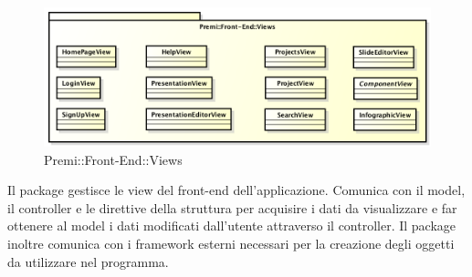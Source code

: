 \begin{figure}[h]
	\centering
	\includegraphics[width=0.7\linewidth]{img/premi_front_end_views}
	\caption[Premi::Front-End::Views]{Premi::Front-End::Views}
\end{figure}
Il package gestisce le view del front-end dell'applicazione. Comunica con il model, il controller e le direttive della struttura per acquisire i dati da visualizzare e far ottenere al model i dati modificati dall'utente attraverso il controller. Il package inoltre comunica con i framework esterni necessari per la creazione degli oggetti da utilizzare nel programma.
